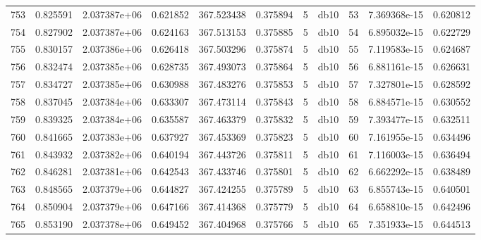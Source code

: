 \begin{tabular}{lrrrrrrlrrr}
753  &    0.825591 &        2.037387e+06 &  0.621852 &              367.523438 &    0.375894 &       5 &         db10 &     53 &   7.369368e-15 &      0.620812 \\
754  &    0.827902 &        2.037387e+06 &  0.624163 &              367.513153 &    0.375885 &       5 &         db10 &     54 &   6.895032e-15 &      0.622729 \\
755  &    0.830157 &        2.037386e+06 &  0.626418 &              367.503296 &    0.375874 &       5 &         db10 &     55 &   7.119583e-15 &      0.624687 \\
756  &    0.832474 &        2.037385e+06 &  0.628735 &              367.493073 &    0.375864 &       5 &         db10 &     56 &   6.881161e-15 &      0.626631 \\
757  &    0.834727 &        2.037385e+06 &  0.630988 &              367.483276 &    0.375853 &       5 &         db10 &     57 &   7.327801e-15 &      0.628592 \\
758  &    0.837045 &        2.037384e+06 &  0.633307 &              367.473114 &    0.375843 &       5 &         db10 &     58 &   6.884571e-15 &      0.630552 \\
759  &    0.839325 &        2.037384e+06 &  0.635587 &              367.463379 &    0.375832 &       5 &         db10 &     59 &   7.393477e-15 &      0.632511 \\
760  &    0.841665 &        2.037383e+06 &  0.637927 &              367.453369 &    0.375823 &       5 &         db10 &     60 &   7.161955e-15 &      0.634496 \\
761  &    0.843932 &        2.037382e+06 &  0.640194 &              367.443726 &    0.375811 &       5 &         db10 &     61 &   7.116003e-15 &      0.636494 \\
762  &    0.846281 &        2.037381e+06 &  0.642543 &              367.433746 &    0.375801 &       5 &         db10 &     62 &   6.662292e-15 &      0.638489 \\
763  &    0.848565 &        2.037379e+06 &  0.644827 &              367.424255 &    0.375789 &       5 &         db10 &     63 &   6.855743e-15 &      0.640501 \\
764  &    0.850904 &        2.037379e+06 &  0.647166 &              367.414368 &    0.375779 &       5 &         db10 &     64 &   6.658810e-15 &      0.642496 \\
765  &    0.853190 &        2.037378e+06 &  0.649452 &              367.404968 &    0.375766 &       5 &         db10 &     65 &   7.351933e-15 &      0.644513 \\

\end{tabular}
